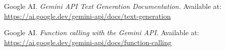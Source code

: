 \documentclass[a4paper,10pt]{article}
\begin{document}
\hfill \break


\begin{thebibliography}{1}

Google AI. \textit{Gemini API Text Generation Documentation.} 
Available at: \url{https://ai.google.dev/gemini-api/docs/text-generation}

Google AI. \textit{Function calling with the Gemini API.} Available at: \url{https://ai.google.dev/gemini-api/docs/function-calling}

\end{thebibliography}


	
	
%	
%	
%	
\end{document}
